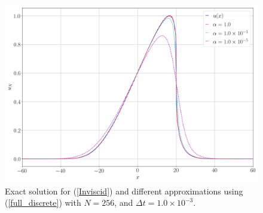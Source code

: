 	\begin{figure}[H]
		\centering
		\includegraphics[width=12cm]{Figures/varios_alphas.png}
		\caption{Exact solution for (\ref{Inviscid}) and different approximations using (\ref{full_discrete}) with $N=256$, and $\Delta t = 1.0 \times 10^{-3}$.}
	\end{figure}
	\newpage
